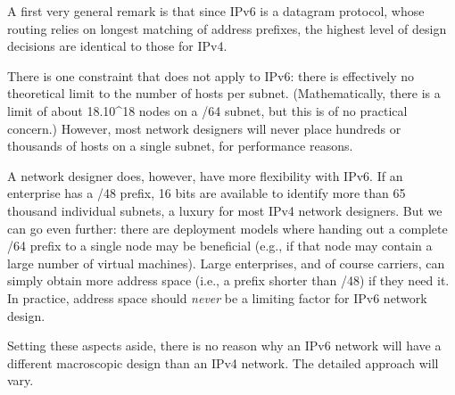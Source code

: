 \documentclass[
]{article}
\begin{document}
A first very general remark is that since IPv6 is a datagram protocol,
whose routing relies on longest matching of address prefixes, the
highest level of design decisions are identical to those for IPv4.

There is one constraint that does not apply to IPv6: there is
effectively no theoretical limit to the number of hosts per subnet.
(Mathematically, there is a limit of about 18.10\^{}18 nodes on a /64
subnet, but this is of no practical concern.) However, most network
designers will never place hundreds or thousands of hosts on a single
subnet, for performance reasons.

A network designer does, however, have more flexibility with IPv6. If an
enterprise has a /48 prefix, 16 bits are available to identify more than
65 thousand individual subnets, a luxury for most IPv4 network
designers. But we can go even further: there are deployment models where
handing out a complete /64 prefix to a single node may be beneficial
(e.g., if that node may contain a large number of virtual machines).
Large enterprises, and of course carriers, can simply obtain more
address space (i.e., a prefix shorter than /48) if they need it. In
practice, address space should \emph{never} be a limiting factor for
IPv6 network design.

Setting these aspects aside, there is no reason why an IPv6 network will
have a different macroscopic design than an IPv4 network. The detailed
approach will vary.
\end{document}
